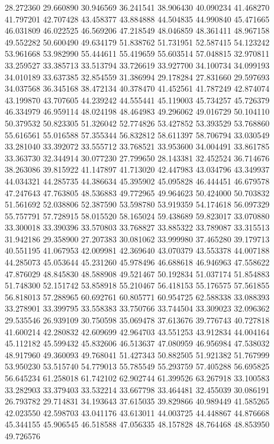 28.272360
29.660890
30.946569
36.241541
38.906430
40.090234
41.468270
41.797201
42.707428
43.458377
43.884888
44.504835
44.990840
45.471665
46.031809
46.022525
46.569206
47.218549
48.046859
48.361411
48.967158
49.552282
50.600490
49.634179
51.838762
51.731951
52.587415
54.123242
53.961668
53.982990
55.444611
55.419659
55.603514
57.048815
32.970811
33.259527
33.385713
33.513794
33.726619
33.927700
34.100734
34.099193
34.010189
33.637385
32.854559
31.386994
29.178284
27.831660
29.597693
34.037568
36.345168
38.472134
40.378470
41.452561
41.787249
42.874074
43.199870
43.707605
44.239242
44.555441
45.119003
45.734257
45.726379
46.334979
46.959114
48.024198
48.464983
49.296062
49.016729
50.104110
50.379532
50.823305
51.326042
52.774826
53.427852
53.393529
53.768860
55.616561
55.016588
57.355344
56.832812
58.611397
58.706794
33.030549
33.281040
33.392072
33.555712
33.768521
33.953600
34.004491
33.861785
33.363730
32.344914
30.077230
27.799650
28.143381
32.452524
36.714676
38.263086
39.815922
41.147897
41.713020
42.447983
43.034796
43.349937
44.034321
44.285735
44.386634
45.395902
45.095828
46.444451
46.679578
47.247643
47.763805
48.536883
49.772965
49.964623
50.424000
50.703832
51.561692
52.038806
52.387590
53.598780
53.919359
54.174618
56.097329
55.757791
57.728915
58.015520
58.165024
59.438689
59.823017
33.070880
33.300018
33.390396
33.570803
33.768827
33.885322
33.789087
33.315513
31.942186
29.358900
27.207383
30.081062
33.999980
37.465280
39.179713
40.551195
41.067953
42.009981
42.369640
43.070379
43.553378
44.007188
44.285073
45.053644
45.231260
45.978496
46.688618
46.946963
47.558622
47.876029
48.845830
48.588908
49.521467
50.192834
51.037174
51.854883
51.748300
52.151742
53.858918
55.210467
56.418153
55.176575
57.561855
56.818013
57.288965
60.692761
60.805771
60.954725
62.588338
33.088393
33.278901
33.399795
33.558383
33.750766
33.744504
33.309023
32.096362
29.535546
26.939109
30.750598
35.069478
37.613676
39.776743
40.727818
41.600214
42.280832
42.609699
42.964703
43.551253
43.912834
44.004164
45.112182
45.599432
45.832606
46.513637
47.080959
46.956984
47.538032
48.917960
49.360093
49.768041
51.427343
50.882505
51.921382
51.767999
53.950230
53.515740
54.779013
55.785549
55.293759
57.405288
56.695825
56.645234
61.258018
61.742102
62.902744
61.399526
63.267918
33.100583
33.282903
33.379403
33.532214
33.667798
33.464481
32.455039
30.086191
26.793782
29.714831
34.193643
37.615035
39.829866
40.989449
41.585265
42.023550
42.598703
43.041176
43.613011
44.003725
44.448867
44.876668
45.344155
45.906545
46.518588
47.056335
48.157828
48.764468
48.853950
49.726576
